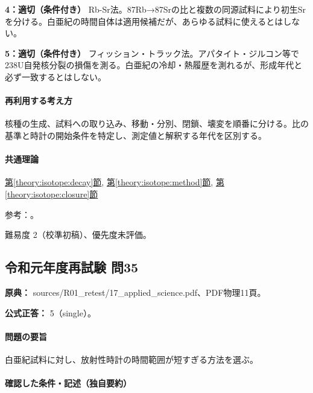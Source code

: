\noindent\textbf{4：適切（条件付き）} Rb-Sr法。87Rb→87Srの比と複数の同源試料により初生Srを分ける。白亜紀の時間自体は適用候補だが、あらゆる試料に使えるとはしない。\par

\noindent\textbf{5：適切（条件付き）} フィッション・トラック法。アパタイト・ジルコン等で238U自発核分裂の損傷を測る。白亜紀の冷却・熱履歴を測れるが、形成年代と必ず一致するとはしない。\par

\paragraph{再利用する考え方} 核種の生成、試料への取り込み、移動・分別、閉鎖、壊変を順番に分ける。比の基準と時計の開始条件を特定し、測定値と解釈する年代を区別する。

\paragraph{共通理論} \hyperref[theory:isotope:decay]{第\ref*{theory:isotope:decay}節}, \hyperref[theory:isotope:method]{第\ref*{theory:isotope:method}節}, \hyperref[theory:isotope:closure]{第\ref*{theory:isotope:closure}節}

\par 参考：\cite{iso_radiometric,iso_zircon}。

\par 難易度 2（校準初稿）、優先度未評価。

\subsection{令和元年度再試験 問35}
\label{q:r01-ret-applied-35}

\noindent\textbf{原典：} sources/R01\_retest/17\_applied\_science.pdf、PDF物理11頁。

\textbf{公式正答：} 5（single）。

\paragraph{問題の要旨} 白亜紀試料に対し、放射性時計の時間範囲が短すぎる方法を選ぶ。

\paragraph{確認した条件・記述（独自要約）}\mbox{}\par

